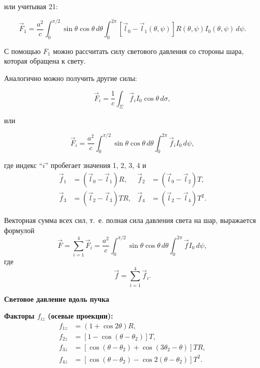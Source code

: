 \documentclass[a4paper]{article}
\begin{document}
или учитывая 21:

\begin{equation}
    \vec{F}_1 = \frac{a^2}{c} \int_0^{\pi/2} \sin \theta \cos \theta \, d\theta 
    \int_0^{2\pi} [\vec{l}_0 - \vec{l}_1(\theta, \psi)] R(\theta, \psi) I_0(\theta, \psi) \, d\psi.\tag{24}
\end{equation}

С помощью $F_{1}$ можно рассчитать силу светового давления со стороны шара, которая обращена к свету.

Аналогично можно получить другие силы:

\begin{equation}
    \vec{F}_i = \frac{1}{c} \int_\Sigma \vec{f}_i I_0 \cos \theta \, d\sigma,\tag{25}
\end{equation}

или

\begin{equation}
    \vec{F}_i = \frac{a^2}{c} \int_0^{\pi/2} \sin \theta \cos \theta \, d\theta \tag{26}
    \int_0^{2\pi} \vec{f}_i I_0 \, d\psi,
\end{equation}

где индекс ``$i$'' пробегает значения 1, 2, 3, 4 и
\begin{equation}
\begin{aligned}
    \vec{f}_1 &= (\vec{l}_0 - \vec{l}_1)R, & \vec{f}_2 &= (\vec{l}_0 - \vec{l}_2)T, \\
    \vec{f}_3 &= (\vec{l}_2 - \vec{l}_3)TR, & \vec{f}_4 &= (\vec{l}_2 - \vec{l}_4)T^2.
\end{aligned}
\tag{27}
\end{equation}

Векторная сумма всех сил, т.~е. полная сила давления света на шар, выражается формулой
\begin{equation}
    \vec{F} = \sum_{i=1}^{4} \vec{F}_i = \frac{a^2}{c} \int_0^{\pi/2} \sin \theta \cos \theta \, d\theta 
    \int_0^{2\pi} \vec{f} I_0 \, d\psi, \tag{28}
\end{equation}
где
\begin{equation}
    \vec{f} = \sum_{i=1}^{4} \vec{f}_i. \tag{29}
\end{equation}

\textbf{Световое давление вдоль пучка}\par

\textbf{Факторы $f_{iz}$ (осевые проекции):}
\begin{align}
    f_{1z} &= (1 + \cos 2\theta) R, \nonumber \\
    f_{2z} &= [1 - \cos(\theta - \theta_2)] T, \nonumber \\
    f_{3z} &= [\cos(\theta - \theta_2) + \cos(3\theta_2 - \theta)] TR, \label{eq:D3.30} \nonumber \\
    f_{4z} &= [\cos(\theta - \theta_2) - \cos 2(\theta - \theta_2)] T^2. \nonumber \tag{30}
\end{align}
\end{document}
